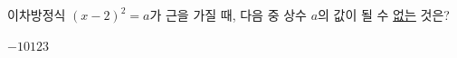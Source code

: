 이차방정식 $(x-2)^2=a$가 근을 가질 때, 다음 중 상수 $a$의 값이 될 수 \underline{없는} 것은?
\begin{choices32}{$-1$}{$0$}{$1$}{$2$}{$3$}\end{choices32}
